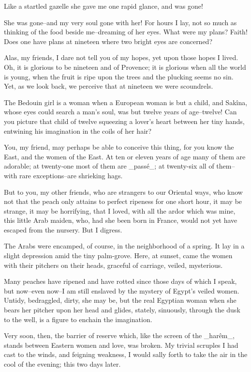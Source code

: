 Like a startled gazelle she gave me one rapid glance, and was gone!

She was gone--and my very soul gone with her! For hours I lay, not so
much as thinking of the food beside me--dreaming of her eyes. What
were my plans? Faith! Does one have plans at nineteen where two bright
eyes are concerned?

Alas, my friends, I dare not tell you of my hopes, yet upon those
hopes I lived. Oh, it is glorious to be nineteen and of Provence; it
is glorious when all the world is young, when the fruit is ripe upon
the trees and the plucking seems no sin. Yet, as we look back, we
perceive that at nineteen we were scoundrels.

The Bedouin girl is a woman when a European woman is but a child, and
Sakîna, whose eyes could search a man's soul, was but twelve years of
age--twelve! Can you picture that child of twelve squeezing a lover's
heart between her tiny hands, entwining his imagination in the coils
of her hair?

You, my friend, may perhaps be able to conceive this thing, for you
know the East, and the women of the East. At ten or eleven years of
age many of them are adorable; at twenty-one most of them are _passé_;
at twenty-six all of them--with rare exceptions--are shrieking hags.

But to you, my other friends, who are strangers to our Oriental ways,
who know not that the peach only attains to perfect ripeness for one
short hour, it may be strange, it may be horrifying, that I loved,
with all the ardor which was mine, this little Arab maiden, who, had
she been born in France, would not yet have escaped from the nursery.
But I digress.

The Arabs were encamped, of course, in the neighborhood of a spring.
It lay in a slight depression amid the tiny palm-grove. Here, at
sunset, came the women with their pitchers on their heads, graceful
of carriage, veiled, mysterious.

Many peaches have ripened and have rotted since those days of which
I speak, but now--even now--I am still enslaved by the mystery of
Egypt's veiled women. Untidy, bedraggled, dirty, she may be, but the
real Egyptian woman when she bears her pitcher upon her head and
glides, stately, sinuously, through the dusk to the well, is a figure
to enchain the imagination.

Very soon, then, the barrier of reserve which, like the screen of the
_harêm_, stands between Eastern women and love, was broken. My trivial
scruples I had cast to the winds, and feigning weakness, I would sally
forth to take the air in the cool of the evening; this two days later.

